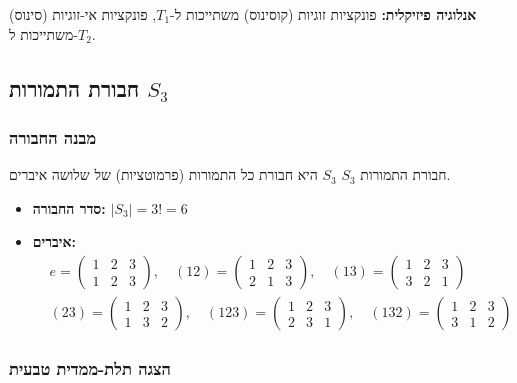 \textbf{אנלוגיה פיזיקלית:} פונקציות זוגיות (קוסינוס) משתייכות ל-$T_1$, פונקציות אי-זוגיות (סינוס) משתייכות ל-$T_2$.

\subsection{חבורת התמורות $S_3$}

\subsubsection{מבנה החבורה}

\begin{definitionbox}[label=def:S3]{חבורת התמורות $S_3$}
$S_3$ היא חבורת כל התמורות (פרמוטציות) של שלושה איברים.
\begin{itemize}
    \item \textbf{סדר החבורה:} $|S_3| = 3! = 6$
    \item \textbf{איברים:} 
    \begin{align*}
    &e = \begin{pmatrix} 1 & 2 & 3 \\ 1 & 2 & 3 \end{pmatrix}, \quad
    (12) = \begin{pmatrix} 1 & 2 & 3 \\ 2 & 1 & 3 \end{pmatrix}, \quad
    (13) = \begin{pmatrix} 1 & 2 & 3 \\ 3 & 2 & 1 \end{pmatrix} \\
    &(23) = \begin{pmatrix} 1 & 2 & 3 \\ 1 & 3 & 2 \end{pmatrix}, \quad
    (123) = \begin{pmatrix} 1 & 2 & 3 \\ 2 & 3 & 1 \end{pmatrix}, \quad
    (132) = \begin{pmatrix} 1 & 2 & 3 \\ 3 & 1 & 2 \end{pmatrix}
    \end{align*}
\end{itemize}
\end{definitionbox}

\subsubsection{הצגה תלת-ממדית טבעית}

